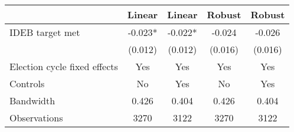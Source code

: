 \begin{tabular}{lcccc}
  \toprule
 & Linear & Linear & Robust & Robust \\ 
  \midrule
IDEB target met & -0.023* & -0.022* & -0.024 & -0.026 \\ 
   & (0.012) & (0.012) & (0.016) & (0.016) \\ 
  Election cycle fixed effects & Yes & Yes & Yes & Yes \\ 
  Controls & No & Yes & No & Yes \\ 
  Bandwidth & 0.426 & 0.404 & 0.426 & 0.404 \\ 
  Observations & 3270 & 3122 & 3270 & 3122 \\ 
   \bottomrule
\end{tabular}
